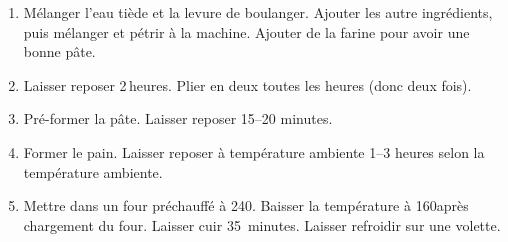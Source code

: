 
\begin{ingredients}
\end{ingredients}


\begin{recipe}
  \begin{enumerate}

  \item Mélanger l'eau tiède et la levure de boulanger.  Ajouter les
    autre ingrédients, puis mélanger et pétrir à la machine.  Ajouter
    de la farine pour avoir une bonne pâte.
    
  \item Laisser reposer 2$\,$\fracH heures.  Plier en deux toutes les
    heures (donc deux fois).
    
  \item Pré-former la pâte.  Laisser reposer 15--20 minutes.
    
  \item Former le pain.  Laisser reposer à température ambiente 1--3
    heures selon la température ambiente.
    
  \item Mettre dans un four préchauffé à 240\degreeC.  Baisser la
    température à 160\degreeC après chargement du four.  Laisser cuir
    35~minutes.  Laisser refroidir sur une volette.

  \end{enumerate}
\end{recipe}

